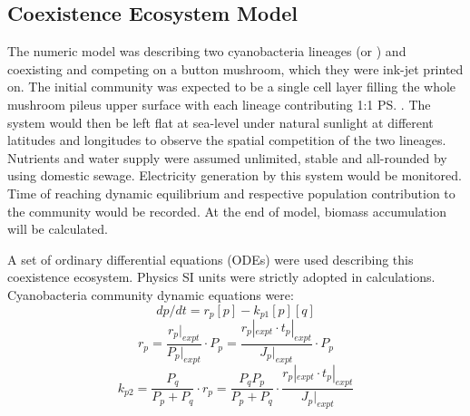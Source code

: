 \documentclass[../thesis.tex]{subfiles} %
\begin{document}
\subsection{Coexistence Ecosystem Model}

The numeric model was describing two cyanobacteria lineages \Ss\autocite{sawa2017electricity} (or \As)\autocite{joshi2018bacterial} and \Cs\autocite{baque2013boss,nurnberg2018photochemistry} coexisting and competing on a button mushroom,\autocite{joshi2018bacterial} which they were ink-jet printed on.  The initial community was expected to be a single cell layer filling the whole mushroom pileus upper surface with each lineage contributing 1:1 \ps.  The system would then be left flat at sea-level under natural sunlight at different latitudes and longitudes to observe the spatial competition of the two lineages.  Nutrients and water supply were assumed unlimited, stable and all-rounded by using domestic sewage.\autocite{markou2014microalgal}  Electricity generation by this system would be monitored.  Time of reaching dynamic equilibrium and respective population contribution to the community would be recorded.  At the end of model, biomass accumulation will be calculated.

A set of ordinary differential equations (ODEs) were used describing this coexistence ecosystem.  Physics SI units were strictly adopted in calculations.  Cyanobacteria community dynamic equations were:
\begin{equation}\label{eq:main}
    dp/dt = r_p [p] - k_{p1} [p][q]
\end{equation}
\begin{equation}\label{eq:growth}
    r_p = \dfrac{r_p|_{expt}}{P_p|_{expt}}\cdot P_p = \dfrac{r_p|_{expt}\cdot t_p|_{expt}}{J_p|_{expt}}\cdot P_p
\end{equation}
\begin{equation}\label{eq:compete}
    k_{p2} = \dfrac{P_q}{P_p + P_q}\cdot r_p = \dfrac{P_q P_p}{P_p + P_q}\cdot \dfrac{r_p|_{expt}\cdot t_p|_{expt}}{J_p|_{expt}}
\end{equation}
\end{document}
